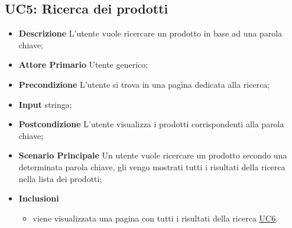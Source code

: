        \subsection{UC5: Ricerca dei prodotti}
        \label{sec:UC5}
        \begin{itemize}
            \item \textbf{Descrizione} L'utente vuole ricercare un prodotto in base ad una parola chiave; 
            \item \textbf{Attore Primario} Utente generico;
            \item \textbf{Precondizione} L'utente si trova in una pagina dedicata alla ricerca; 
            \item \textbf{Input} stringa;
            \item \textbf{Postcondizione} L'utente visualizza i prodotti corrispondenti alla parola chiave;
            \item \textbf{Scenario Principale} Un utente vuole ricercare un prodotto secondo una determinata parola chiave, gli vengo mostrati tutti i risultati della ricerca nella lista dei prodotti;
            \item \textbf{Inclusioni}
            \begin{itemize}
                \item viene visualizzata una pagina con tutti i risultati della ricerca \hyperref[sec:UC6]{\underline{UC6}}.
            \end{itemize}
        \end{itemize}
